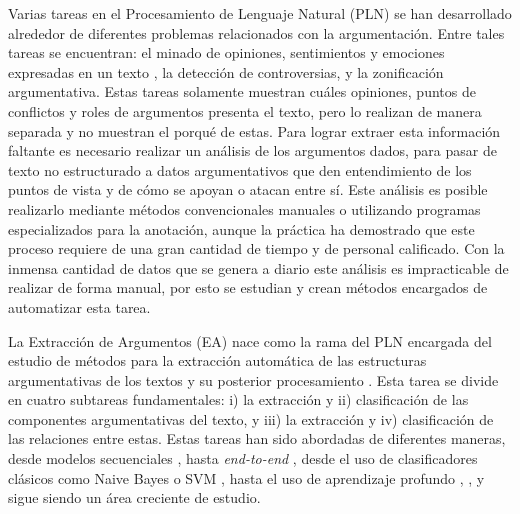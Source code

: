 \documentclass[a4paper,11pt,twocolumn,twoside]{article}
\begin{document}

Varias tareas en el Procesamiento de Lenguaje Natural (PLN) se han desarrollado alrededor
de diferentes problemas relacionados con 
la argumentación. Entre tales tareas se encuentran: el minado de opiniones, sentimientos y 
emociones expresadas en un texto 
\cite{liu2010sentiment}, la detección de controversias, y la zonificación
argumentativa. Estas tareas solamente muestran cuáles opiniones, puntos de conflictos y roles 
de argumentos 
presenta el texto, pero lo realizan de manera separada y no muestran el porqué de estas. 
Para lograr extraer esta información faltante es necesario realizar un 
análisis de los argumentos dados, para pasar de texto no estructurado a datos argumentativos 
que den entendimiento de los puntos de vista y de cómo se apoyan o atacan entre sí. Este análisis
es posible realizarlo mediante métodos convencionales manuales o utilizando programas
especializados para la anotación, aunque la práctica ha demostrado que este proceso requiere 
de una gran cantidad de tiempo y de personal calificado. Con la inmensa cantidad de datos 
que se genera a diario este análisis es impracticable de realizar de forma manual, por esto se 
estudian y crean métodos encargados de automatizar esta tarea.


La Extracción de Argumentos (EA) nace como la rama del PLN encargada
del estudio de métodos para la extracción automática de las estructuras argumentativas de 
los textos y su posterior procesamiento \cite{lawrence2020argument}. Esta tarea se divide en 
cuatro subtareas fundamentales: i) la extracción y ii) clasificación de las componentes 
argumentativas del texto, y iii) la extracción y 
iv) clasificación de las relaciones entre estas. Estas tareas han sido abordadas de diferentes maneras,
desde modelos secuenciales \cite{palau2009argumentation}, \cite{goudas2015argument} hasta 
\textit{end-to-end} \cite{eger2017neural}, desde el uso de clasificadores clásicos 
como Naive Bayes o SVM \cite{niculae2017argument}, \cite{stab2017parsing} hasta el uso de 
aprendizaje profundo \cite{galassi2021deep}, \cite{mayer2020transformer}, y sigue 
siendo un área creciente de estudio.
\end{document}
